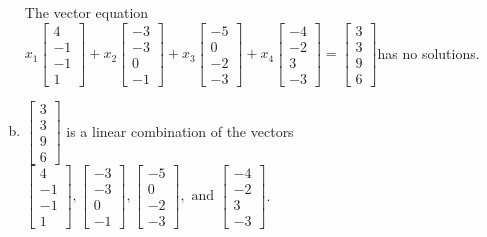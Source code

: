 \begin{exerciseAnswer}
\begin{enumerate}[(a)]
\begin{center}
\begin{minipage}{0.8\textwidth}
 The vector equation \( x_{1} \left[\begin{array}{c}
4 \\
-1 \\
-1 \\
1
\end{array}\right] + x_{2} \left[\begin{array}{c}
-3 \\
-3 \\
0 \\
-1
\end{array}\right] + x_{3} \left[\begin{array}{c}
-5 \\
0 \\
-2 \\
-3
\end{array}\right] + x_{4} \left[\begin{array}{c}
-4 \\
-2 \\
3 \\
-3
\end{array}\right] = \left[\begin{array}{c}
3 \\
3 \\
9 \\
6
\end{array}\right] \)has no solutions.
\end{minipage}\end{center}
    
\item 

\( \left[\begin{array}{c}
3 \\
3 \\
9 \\
6
\end{array}\right] \) is a linear combination of the vectors \( \left[\begin{array}{c}
4 \\
-1 \\
-1 \\
1
\end{array}\right] , \left[\begin{array}{c}
-3 \\
-3 \\
0 \\
-1
\end{array}\right] , \left[\begin{array}{c}
-5 \\
0 \\
-2 \\
-3
\end{array}\right] , \text{ and } \left[\begin{array}{c}
-4 \\
-2 \\
3 \\
-3
\end{array}\right] \). 


\end{enumerate}
    
\end{exerciseAnswer}
    
